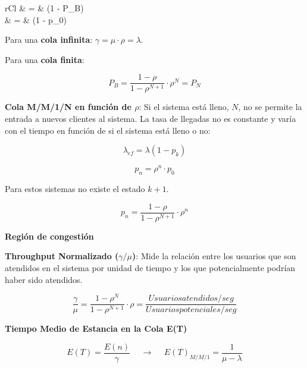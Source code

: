 \documentclass[9pt,landscape]{extarticle}
\begin{document}
\begin{multicols}{3}
	\begin{IEEEeqnarray*}{rCl}
		\gamma & = & \lambda \cdot (1 - P_{B}) \\
			     & = & \mu \cdot (1 - p_{0})		
	\end{IEEEeqnarray*}
	
Para una \textbf{cola infinita}: $\gamma = \mu \cdot \rho = \lambda$.
	
Para una \textbf{cola finita}:

	\begin{equation*}
		P_{B} = \frac{1 - \rho}{1 - \rho^{N+1}} \cdot \rho^{N} = P_{N}
	\end{equation*}
	
\textbf{Cola M/M/1/N en función de $\rho$}: Si el sistema está lleno, $N$, no se permite la entrada a nuevos clientes al sistema. La tasa de llegadas no es constante y varía con el tiempo en función de si el sistema está lleno o no:
	
	\begin{equation*}
	\lambda_{ef} = \lambda (1 - p_{k})
	\end{equation*}
	
	\begin{equation*}
	p_{n} = \rho^{n} \cdot p_{0}
	\end{equation*}
	
Para estos sistemas no existe el estado $k+1$.

	\begin{equation*}
		p_{n} = \frac{1 - \rho}{1 - \rho^{N+1}} \cdot \rho^{n}
	\end{equation*}
	
	\textbf{Región de congestión}
	
\textbf{Throughput Normalizado ($\gamma / \mu$)}: Mide la relación entre los usuarios que son atendidos en el sistema por unidad de tiempo y los que potencialmente podrían haber sido atendidos.

	\begin{equation*}
		\frac{\gamma}{\mu} = \frac{1 - \rho^{N}}{1 - \rho^{N+1}} \cdot \rho = \frac{Usuarios atendidos / seg}{Usuarios potenciales / seg}
	\end{equation*}
	
	
\textbf{Tiempo Medio de Estancia en la Cola E(T)}
	
	\begin{equation*}
		E(T) = \frac{E(n)}{\gamma} \hspace{15pt} \rightarrow \hspace{15pt} E(T)_{M/M/1} = \frac{1}{\mu - \lambda}
	\end{equation*}
	

\end{multicols}
\end{document}
